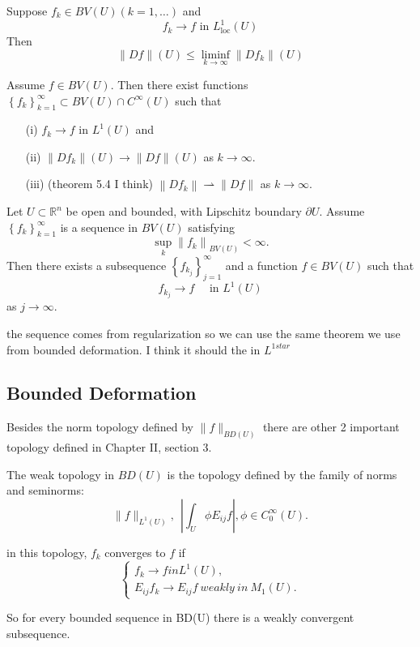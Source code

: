 \begin{theorem}

Suppose $f_k \in B V(U)(k=1, \ldots)$ and
$$
f_k \rightarrow f \text { in } L_{\mathrm{loc}}^1(U)
$$
Then
$$
\|D f\|(U) \leq \liminf _{k \rightarrow \infty}\left\|D f_k\right\|(U)
$$
\end{theorem}
\begin{theorem}

Assume $f\in BV(U)$. Then there exist functions $\left\{f_k\right\}_{k=1}^{\infty} \subset B V(U) \cap C^{\infty}(U)$ such that
\begin{itemize}
    \item[(i)] $f_k \rightarrow f$ in $L^1(U)$ and
    \item[(ii)] $\left\|D f_k\right\|(U) \rightarrow\|D f\|(U)$ as $k \rightarrow \infty$.
    \item [(iii)](theorem 5.4 I think) $\left\|D f_k\right\|  \rightharpoonup \|D f\|$ as $k \rightarrow \infty$.
\end{itemize}
\end{theorem}
\begin{theorem}
 Let $U \subset \mathbb{R}^n$ be open and bounded, with Lipschitz boundary $\partial U$. Assume $\left\{f_k\right\}_{k=1}^{\infty}$ is a sequence in $B V(U)$ satisfying
$$
\sup _k\left\|f_k\right\|_{B V(U)}<\infty .
$$
Then there exists a subsequence $\left\{f_{k_j}\right\}_{j=1}^{\infty}$ and a function $f \in B V(U)$ such that
$$
f_{k_j} \rightarrow f \quad \text { in } L^1(U)
$$
as $j \rightarrow \infty$.
\end{theorem}
\begin{com}
the sequence comes from regularization so we can use the same theorem we use from bounded deformation.
I think it should the in $L^{1star}$
\end{com}
\subsection{Bounded Deformation}

Besides the norm topology defined by $\|f\|_{BD(U)}$ there are other 2 important topology defined in \cite{RogerBook} Chapter II, section 3.
\begin{definition}
The weak topology in $BD(U)$ is the topology defined by the family of norms and seminorms:
$$\|f\|_{L^1(U)},\ \  \left| \int_U  \phi E_{ij} f \right| , \phi \in C^\infty_0(U).$$

in this topology, $f_k$ converges to $f$ if
$$\begin{cases} f_k\to f in L^1(U),\\
E_{ij}f_k \to E_{ij}f \ weakly\ in \ M_1(U).\end{cases}
$$
\end{definition}
So for every bounded sequence in BD(U) there is a weakly convergent subsequence.

